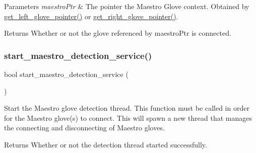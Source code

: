 \begin{DoxyParams}{Parameters}
{\em maestro\+Ptr} & The pointer the Maestro Glove context. Obtained by \hyperlink{group__glove_management_ga63ce3c99d4a8b8db851b22af9185764e}{get\+\_\+left\+\_\+glove\+\_\+pointer()} or \hyperlink{group__glove_management_ga9b8fd9d91aeac3f8da50f7a7eba0c32b}{get\+\_\+right\+\_\+glove\+\_\+pointer()}. \\
\hline
\end{DoxyParams}
\begin{DoxyReturn}{Returns}
Whether or not the glove referenced by {\ttfamily maestro\+Ptr} is connected. 
\end{DoxyReturn}
\mbox{\label{group__glove_management_ga10088517f643220611dfcd5da08bfaa1}} 
\subsubsection{\texorpdfstring{start\+\_\+maestro\+\_\+detection\+\_\+service()}{start\_maestro\_detection\_service()}}
{\footnotesize\ttfamily bool start\+\_\+maestro\+\_\+detection\+\_\+service (\begin{DoxyParamCaption}{ }\end{DoxyParamCaption})}

Start the Maestro glove detection thread. This function must be called in order for the Maestro glove(s) to connect. This will spawn a new thread that manages the connecting and disconnecting of Maestro gloves. \begin{DoxyReturn}{Returns}
Whether or not the detection thread started successfully. 
\end{DoxyReturn}
